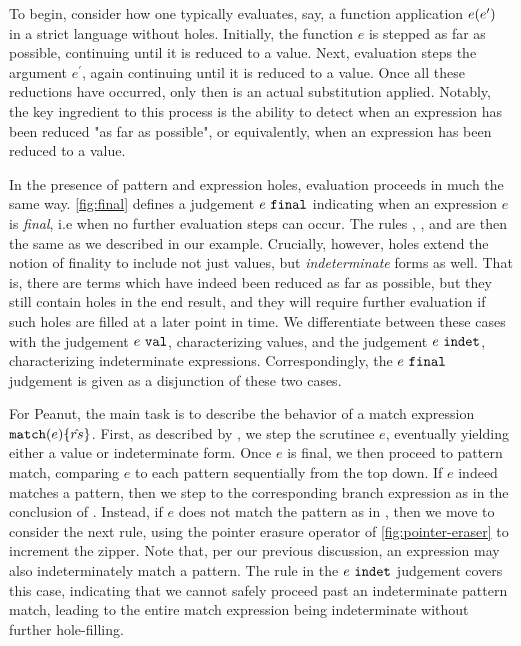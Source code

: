 To begin, consider how one typically evaluates, say, a function application $e(e^\prime)$ in a strict language without holes. Initially, the function $e$ is stepped as far as possible, continuing until it is reduced to a value. Next, evaluation steps the argument $e^\prime$, again continuing until it is reduced to a value. Once all these reductions have occurred, only then is an actual substitution applied. Notably, the key ingredient to this process is the ability to detect when an expression has been reduced "as far as possible", or equivalently, when an expression has been reduced to a value. 

In the presence of pattern and expression holes, evaluation proceeds in much the same way. \autoref{fig:final} defines a judgement $e ~\mathtt{final}$ indicating when an expression $e$ is \emph{final}, i.e when no further evaluation steps can occur. The rules \ITApFun, \ITApArg, and \ITAp are then the same as we described in our example. Crucially, however, holes extend the notion of finality to include not just values, but \emph{indeterminate} forms as well. That is, there are terms which have indeed been reduced as far as possible, but they still contain holes in the end result, and they will require further evaluation if such holes are filled at a later point in time. We differentiate between these cases with the judgement $e ~\mathtt{val}$, characterizing values, and the judgement $e ~\mathtt{indet}$, characterizing indeterminate expressions. Correspondingly, the $e ~\mathtt{final}$ judgement is given as a disjunction of these two cases.

For Peanut, the main task is to describe the behavior of a match expression $\mathtt{match}(e) \{\hat{rs}\}$. First, as described by \ITExpMatch, we step the scrutinee $e$, eventually yielding either a value or indeterminate form. Once $e$ is final, we then proceed to pattern match, comparing $e$ to each pattern sequentially from the top down. If $e$ indeed matches a pattern, then we step to the corresponding branch expression as in the conclusion of \ITSuccMatch. Instead, if $e$ does not match the pattern as in \ITFailMatch, then we move to consider the next rule, using the pointer erasure operator of \autoref{fig:pointer-eraser} to increment the zipper. Note that, per our previous discussion, an expression may also indeterminately match a pattern. The \IMatch rule in the $e ~\mathtt{indet}$ judgement covers this case, indicating that we cannot safely proceed past an indeterminate pattern match, leading to the entire match expression being indeterminate without further hole-filling.

